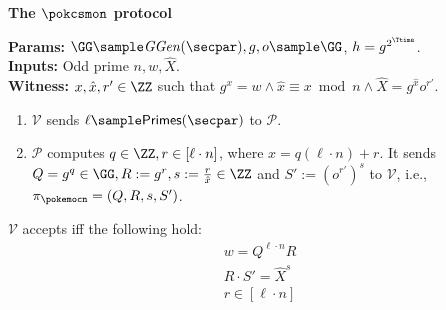 \begin{mdframed}
\begin{center}
    \textbf{The $\pokcsmon$ protocol}
\end{center}
\textbf{Params:} $\GG \sample\mathit{GGen}(\secpar),g,o\sample\GG$, $h = g^{2^\Ttime}$.\hfill\\
\textbf{Inputs:} Odd prime $n, w, \hat{X}$. \hfill\\
\textbf{Witness:} $x,\hat{x},r' \in \ZZ$ such that $g^x=w\land \hat{x} \equiv x \bmod{n} \land \hat{X} = g^{\hat{x}} o^{r'}$.
\hfill\\
\begin{enumerate}
    \item $\mathcal{V}$ sends $\ell \sample\mathsf{Primes}(\secpar)$ to $\mathcal{P}$.
    \item $\mathcal{P}$ computes $q\in\ZZ, r\in[\ell \cdot n]$, where $x=q(\ell \cdot n)+r$. It sends $Q=g^q\in\GG,R:=g^r,s:=\frac{r}{\hat{x}}\in\ZZ$ and $S':=(o^{r'})^s$ to $\mathcal{V}$, i.e., $\pi_{\pokemocn}=(Q,R,s,S')$.
\end{enumerate}
$\mathcal{V}$ accepts iff the following hold:
\begin{align*}
    w = Q^{\ell \cdot n}R\\
    R\cdot S'=\hat{X}^s\\
    r \in [\ell \cdot n]
\end{align*}
\end{mdframed}
